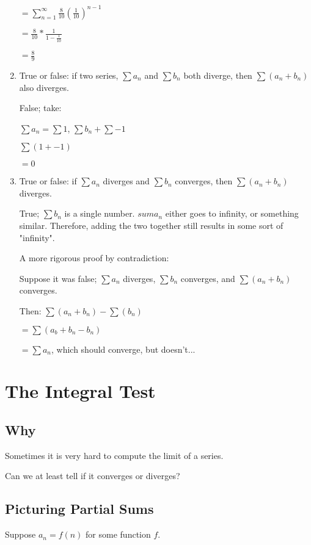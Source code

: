 \documentclass{article}
\begin{document}
\begin{enumerate}
    $= \sum_{n=1}^{\infty} \frac{8}{10}(\frac{1}{10})^{n-1}$
    
    $=\frac{8}{10} * \frac{1}{1-\frac{1}{10}}$
    
    $=\frac{8}{9}$
    
    \item True or false: if two series, $\sum a_n$ and $\sum b_n$ both diverge, then $\sum(a_n+b_n)$ also diverges.
    
    False; take:
    
    $\sum a_n = \sum 1$, $\sum b_n + \sum -1$
    
    $\sum(1+-1)$
    
    $ = 0$
    
    \item True or false: if $\sum a_n$ diverges and $\sum b_n$ converges, then $\sum (a_n+b_n)$ diverges.
    
    True; $\sum b_n$ is a single number. $sum a_n$ either goes to infinity, or something similar. Therefore, adding the two together still results in some sort of "infinity".
    
    A more rigorous proof by contradiction:
    
    Suppose it was false; $\sum a_n$ diverges, $\sum b_n$ converges, and $\sum (a_n+b_n)$ converges.
    
    Then: $\sum (a_n+b_n)-\sum(b_n)$
    
    $=\sum (a_b +b_n-b_n)$
    
    $=\sum a_n$, which should converge, but doesn't...
    
\end{enumerate}

\section{The Integral Test}

\subsection{Why}
Sometimes it is very hard to compute the limit of a series.

Can we at least tell if it converges or diverges?

\subsection{Picturing Partial Sums}

Suppose $a_n = f(n)$ for some function $f$.
\end{document}
